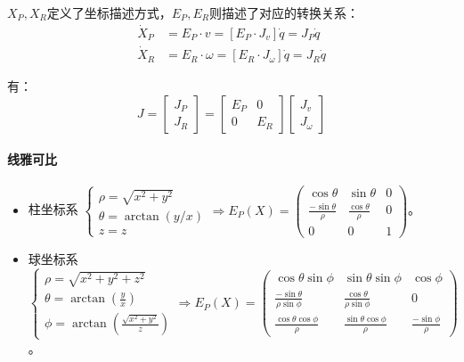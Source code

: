 \documentclass[
12pt, %
a4paper, 
oneside, %
headinclude,footinclude, %
]{scrartcl}
\begin{document}
$ X_P, X_R $定义了坐标描述方式，$ E_P, E_R $则描述了对应的转换关系：
\begin{align*}
\dot{X}_P &= E_P \cdot v = [E_P \cdot J_v] \dot{q} = J_P \dot{q} \\
\dot{X}_R &= E_R \cdot \omega = [E_R \cdot J_\omega] \dot{q} = J_R \dot{q}
\end{align*}

有：
$$ J = \begin{bmatrix} J_P \\ J_R \end{bmatrix} = \begin{bmatrix} E_P & 0 \\ 0 & E_R \end{bmatrix} \begin{bmatrix} J_v \\ J_\omega \end{bmatrix} $$
\paragraph{线雅可比}
\begin{itemize}
\item 柱坐标系
$
\begin{cases}
\rho = \sqrt{x^2 + y^2} \\
\theta = \arctan(y / x) \\
z = z
\end{cases}
\Rightarrow
E_P(X) = \begin{pmatrix} \cos\theta & \sin\theta & 0 \\ \frac{-\sin\theta}{\rho} & \frac{\cos\theta}{\rho} & 0 \\ 0 & 0 & 1 \end{pmatrix}
$。
\item 球坐标系
$
\begin{cases}
\rho = \sqrt{x^2 + y^2 + z^2} \\
\theta = \arctan(\frac{y}{x}) \\
\phi = \arctan(\frac{\sqrt{x^2 + y^2}}{z})
\end{cases}
\Rightarrow
E_P(X) = \begin{pmatrix} \cos\theta \sin\phi & \sin\theta \sin\phi & \cos\phi \\ \frac{-\sin\theta}{\rho \sin\phi} & \frac{\cos\theta}{\rho \sin\phi} & 0 \\ \frac{\cos\theta \cos\phi}{\rho} & \frac{\sin\theta \cos\phi}{\rho} & \frac{-\sin\phi}{\rho} \end{pmatrix}
$。
\end{itemize} 
\end{document}
